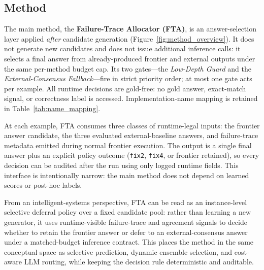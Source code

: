\subsection{Method}
\label{sec:method}

The main method, the \textbf{Failure-Trace Allocator (FTA)}, is an
answer-selection layer applied \emph{after} candidate generation
(Figure~\ref{fig:method_overview}).
It does not generate new candidates and does not issue additional inference
calls: it selects a final answer from already-produced frontier and external
outputs under the same per-method budget cap.
Its two gates---the \emph{Low-Depth Guard} and the
\emph{External-Consensus Fallback}---fire in strict priority order; at most
one gate acts per example.
All runtime decisions are gold-free: no gold answer, exact-match signal, or
correctness label is accessed.
Implementation-name mapping is retained in Table~\ref{tab:name_mapping}.

At each example, FTA consumes three classes of runtime-legal inputs:
the frontier answer candidate, the three evaluated external-baseline answers,
and failure-trace metadata emitted during normal frontier execution.
The output is a single final answer plus an explicit policy outcome
(\texttt{fix2}, \texttt{fix4}, or frontier retained), so every decision can be
audited after the run using only logged runtime fields.
This interface is intentionally narrow: the main method does not depend on
learned scores or post-hoc labels.

From an intelligent-systems perspective, FTA can be read as an
instance-level selective deferral policy over a fixed candidate pool:
rather than learning a new generator, it uses runtime-visible
failure-trace and agreement signals to decide whether to retain the
frontier answer or defer to an external-consensus answer under a
matched-budget inference contract.
This places the method in the same conceptual space as selective
prediction, dynamic ensemble selection, and cost-aware LLM routing, while
keeping the decision rule deterministic and auditable.

